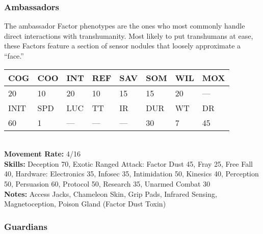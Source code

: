 \subsubsection{Ambassadors} The ambassador Factor phenotypes are the ones who most commonly handle direct interactions with transhumanity. Most likely to put transhumans at ease, these Factors feature a section of sensor nodules that loosely approximate a ``face.'' \\ \begin{tabular}{|l|l|l|l|l|l|l|l|} \hline

COG &COO &INT &REF &SAV &SOM &WIL &MOX \\ \hline

20 &10 &20 &10 &15 &15 &20 &— \\ \hline

INIT &SPD &LUC &TT &IR &DUR &WT &DR \\ \hline

60 &1 &— &— &— &30 &7 &45 \\ \hline

\end{tabular} \\ \textbf{Movement Rate: }4/16 \\ \textbf{Skills:} Deception 70, Exotic Ranged Attack: Factor Dust 45, Fray 25, Free Fall 40, Hardware: Electronics 35, Infosec 35, Intimidation 50, Kinesics 40, Perception 50, Persuasion 60, Protocol 50, Research 35, Unarmed Combat 30 \\ \textbf{Notes: }Access Jacks, Chameleon Skin, Grip Pads, Infrared Sensing, Magnetoception, Poison Gland (Factor Dust Toxin) 



\subsubsection{Guardians} 

